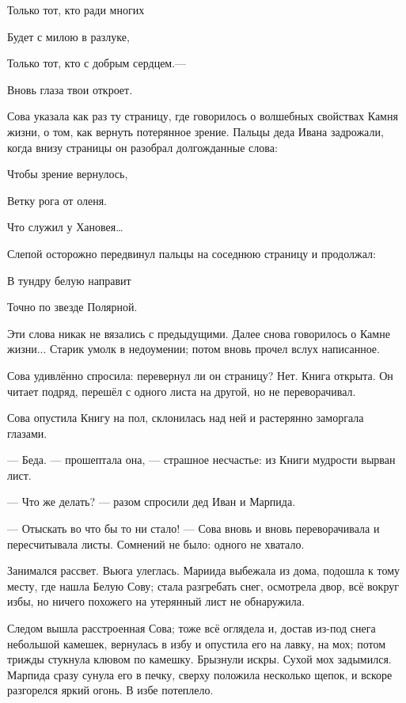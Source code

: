 \documentclass[oneside,final,14pt]{extreport}
\begin{document}
	
	
	
\qquad \qquad \qquad 	Только тот, кто ради многих
	
\qquad \qquad \qquad 	Будет с милою в разлуке,
	
\qquad \qquad \qquad 	Только тот, кто с добрым сердцем.—
	
\qquad \qquad \qquad 	Вновь глаза твои откроет.
	
	
	
	
	Сова указала как раз ту страницу, где говорилось о волшебных свойствах Камня жизни, о том, как вернуть потерянное зрение. Пальцы деда Ивана задрожали, когда внизу страницы он разобрал долгожданные слова: 
	
	
	
	
\qquad \qquad \qquad 	Чтобы зрение вернулось,
	
\qquad \qquad \qquad 	Ветку рога от оленя.
	
\qquad \qquad \qquad 	Что служил у Хановея…
	
	
	
	
	Слепой осторожно передвинул пальцы на соседнюю страницу и продолжал:
	
	
	
	
\qquad \qquad \qquad 	В тундру белую направит
	
\qquad \qquad \qquad 	Точно по звезде Полярной.
	
	
	
	
	Эти слова никак не вязались с предыдущими. Далее снова говорилось о Камне жизни... Старик умолк в недоумении; потом вновь прочел вслух написанное.
	
	Сова удивлённо спросила: перевернул ли он страницу? Нет. Книга открыта. Он читает подряд, перешёл с одного листа на другой, но не переворачивал.
	
	Сова опустила Книгу на пол, склонилась над ней и растерянно заморгала глазами.
	
	— Беда. — прошептала она, — страшное несчастье: из Книги мудрости вырван лист.
	
	— Что же делать? — разом спросили дед Иван и Марпида.
	
	— Отыскать во что бы то ни стало! — Сова вновь и вновь переворачивала и пересчитывала листы. Сомнений не было: одного не хватало.
	
	Занимался рассвет. Вьюга улеглась. Мариида выбежала из дома, подошла к тому месту, где нашла Белую Сову; стала разгребать снег, осмотрела двор, всё вокруг избы, но ничего похожего на утерянный лист не обнаружила.
	
	Следом вышла расстроенная Сова; тоже всё оглядела и, достав из-под снега небольшой камешек, вернулась в избу и опустила его на лавку, на мох; потом трижды стукнула клювом по камешку. Брызнули искры. Сухой мох задымился. Марпида сразу сунула его в печку, сверху положила несколько щепок, и вскоре разгорелся яркий огонь. В избе потеплело.
	
\end{document}

